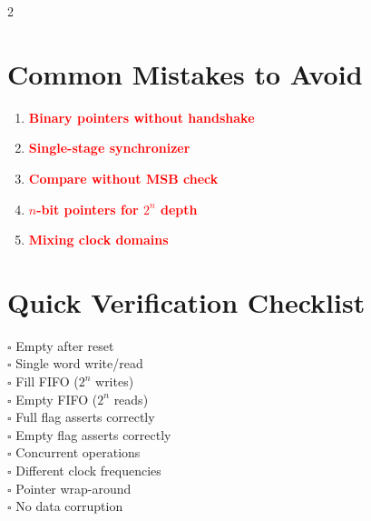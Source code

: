 \documentclass[10pt,landscape]{article}
\begin{document}
\begin{multicols}{2}
\section*{Common Mistakes to Avoid}

\begin{tcolorbox}[colback=red!10,colframe=red!75!black,title=\textbf{NEVER DO THIS}]
\begin{enumerate}
    \item \textcolor{red}{\textbf{Binary pointers without handshake}}
    \item \textcolor{red}{\textbf{Single-stage synchronizer}}
    \item \textcolor{red}{\textbf{Compare without MSB check}}
    \item \textcolor{red}{\textbf{$n$-bit pointers for $2^n$ depth}}
    \item \textcolor{red}{\textbf{Mixing clock domains}}
\end{enumerate}
\end{tcolorbox}

\section*{Quick Verification Checklist}

$\square$ Empty after reset\\
$\square$ Single word write/read\\
$\square$ Fill FIFO ($2^n$ writes)\\
$\square$ Empty FIFO ($2^n$ reads)\\
$\square$ Full flag asserts correctly\\
$\square$ Empty flag asserts correctly\\
$\square$ Concurrent operations\\
$\square$ Different clock frequencies\\
$\square$ Pointer wrap-around\\
$\square$ No data corruption

\end{multicols}

\vfill

\begin{center}
\end{center}
\end{document}
